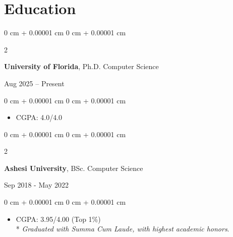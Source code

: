\documentclass[10pt, letterpaper]{article}
\newenvironment{highlights}{
    \begin{itemize}[
        topsep=0.10 cm,
        parsep=0.10 cm,
        partopsep=0pt,
        itemsep=0pt,
        leftmargin=0 cm + 10pt
    ]
}{
    \end{itemize}
} %
\newenvironment{highlightsforbulletentries}{
    \begin{itemize}[
        topsep=0.10 cm,
        parsep=0.10 cm,
        partopsep=0pt,
        itemsep=0pt,
        leftmargin=10pt
    ]
}{
    \end{itemize}
} %
\newenvironment{onecolentry}{
    \begin{adjustwidth}{
        0 cm + 0.00001 cm
    }{
        0 cm + 0.00001 cm
    }
}{
    \end{adjustwidth}
} %
\newenvironment{twocolentry}[2][]{
    \onecolentry
    \def\secondColumn{#2}
    \setcolumnwidth{\fill, 4.5 cm}
    \begin{paracol}{2}
}{
    \switchcolumn \raggedleft \secondColumn
    \end{paracol}
    \endonecolentry
} %
\begin{document}







    \section{Education}
        \begin{twocolentry}{
            Aug 2025 – Present
        }
            \textbf{University of Florida}, Ph.D. Computer Science
        \end{twocolentry}

        \vspace{0.10 cm}
        \begin{onecolentry}
            \begin{highlights}
                \item CGPA: 4.0/4.0
            \end{highlights}
        \end{onecolentry}
        \vspace{0.20 cm}
        \begin{twocolentry}
            {Sep 2018 - May 2022}
            \textbf{Ashesi University}, BSc. Computer Science
        \end{twocolentry}
        \vspace{0.10 cm}
        \begin{onecolentry}
            \begin{highlights}
                \item CGPA: 3.95/4.00 (Top 1\%) \\
                * \textit{Graduated with Summa Cum Laude, with highest academic honors}.
            \end{highlights}
        \end{onecolentry}
\end{document}
